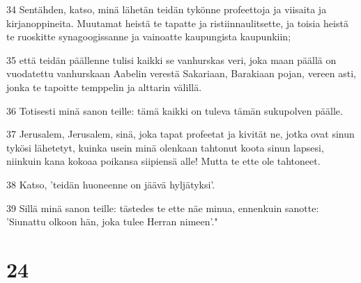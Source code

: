 \par 34 Sentähden, katso, minä lähetän teidän tykönne profeettoja ja viisaita ja kirjanoppineita. Muutamat heistä te tapatte ja ristiinnaulitsette, ja toisia heistä te ruoskitte synagoogissanne ja vainoatte kaupungista kaupunkiin;
\par 35 että teidän päällenne tulisi kaikki se vanhurskas veri, joka maan päällä on vuodatettu vanhurskaan Aabelin verestä Sakariaan, Barakiaan pojan, vereen asti, jonka te tapoitte temppelin ja alttarin välillä.
\par 36 Totisesti minä sanon teille: tämä kaikki on tuleva tämän sukupolven päälle.
\par 37 Jerusalem, Jerusalem, sinä, joka tapat profeetat ja kivität ne, jotka ovat sinun tykösi lähetetyt, kuinka usein minä olenkaan tahtonut koota sinun lapsesi, niinkuin kana kokoaa poikansa siipiensä alle! Mutta te ette ole tahtoneet.
\par 38 Katso, 'teidän huoneenne on jäävä hyljätyksi'.
\par 39 Sillä minä sanon teille: tästedes te ette näe minua, ennenkuin sanotte: 'Siunattu olkoon hän, joka tulee Herran nimeen'."

\chapter{24}

